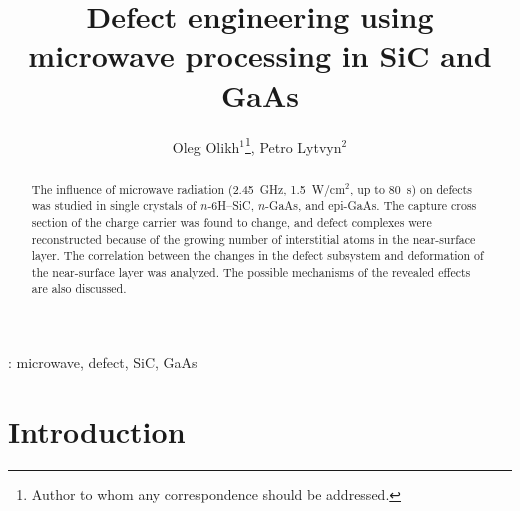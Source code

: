 \documentclass[10pt]{iopart}
\begin{document}
\title[Defect engineering using microwave processing in SiC and GaAs]{Defect engineering using microwave processing in SiC and GaAs}

\author{Oleg Olikh$^1$\footnote{Author to whom any correspondence should be addressed.}, Petro Lytvyn$^2$}

\address{$^1$Physics Faculty, Taras Shevchenko National University of Kyiv, Kyiv 01601, Ukraine}
\address{$^2$V. Lashkaryov Institute of Semiconductor Physics of NAS of Ukraine, Kyiv 03028, Ukraine}

\begin{abstract}
The influence of microwave radiation (2.45~GHz, 1.5~W/cm$^2$, up to 80~s) on defects was studied in single crystals of $n$-6H–SiC, $n$-GaAs, and epi-GaAs.
The capture cross section of the charge carrier was found to change,
and defect complexes were reconstructed because of the growing number of  interstitial atoms in the near-surface layer.
The correlation between the changes in the defect subsystem and deformation of the near-surface layer was analyzed.
The possible mechanisms of the revealed effects are also discussed.
\end{abstract}

%
\vspace{2pc}
: microwave, defect, SiC, GaAs

\submitto{\SST}
%

\ioptwocol
%


\section{Introduction}\label{sec:Int}
\end{document}
